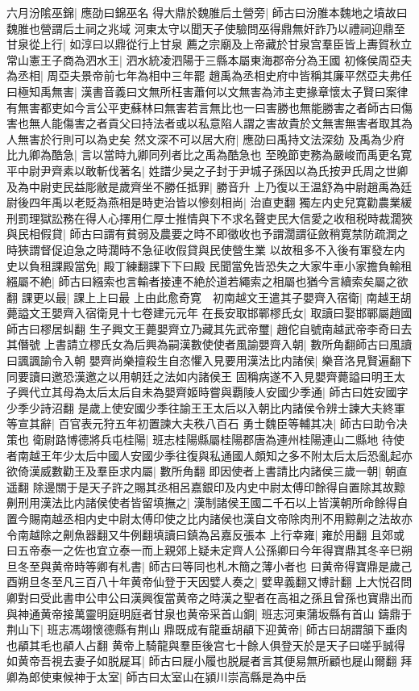 六月汾隂巫錦|{
	應劭曰錦巫名}
得大鼎於魏脽后土營旁|{
	師古曰汾脽本魏地之墳故曰魏脽也營謂后土祠之兆域}
河東太守以聞天子使驗問巫得鼎無奸詐乃以禮祠迎鼎至甘泉從上行|{
	如淳曰以鼎從行上甘泉}
薦之宗廟及上帝藏於甘泉宫羣臣皆上夀賀秋立常山憲王子商為泗水王|{
	泗水統凌泗陽于三縣本屬東海郡帝分為王國}
初條侯周亞夫為丞相|{
	周亞夫景帝前七年為相中三年罷}
趙禹為丞相史府中皆稱其廉平然亞夫弗任曰極知禹無害|{
	漢書音義曰文無所枉害蕭何以文無害為沛主吏掾章懷太子賢曰案律有無害都吏如今言公平吏蘇林曰無害若言無比也一曰害勝也無能勝害之者師古曰傷害也無人能傷害之者貢父曰持法者或以私意陷人謂之害故貴於文無害無害者取其為人無害於行則可以為史矣}
然文深不可以居大府|{
	應劭曰禹持文法深劾}
及禹為少府比九卿為酷急|{
	言以當時九卿同列者比之禹為酷急也}
至晚節吏務為嚴峻而禹更名寛平中尉尹齊素以敢斬伐著名|{
	姓譜少昊之子封于尹城子孫因以為氏按尹氏周之世卿}
及為中尉吏民益彫敝是歲齊坐不勝任抵罪|{
	勝音升}
上乃復以王温舒為中尉趙禹為廷尉後四年禹以老貶為燕相是時吏治皆以慘刻相尚|{
	治直吏翻}
獨左内史兒寛勸農業緩刑罰理獄訟務在得人心擇用仁厚士推情與下不求名聲吏民大信愛之收租税時裁濶狹與民相假貸|{
	師古曰謂有貧弱及農要之時不即徵收也予謂濶謂征斂稍寛禁防疏潤之時狹謂督促迫急之時濶時不急征收假貸與民使營生業}
以故租多不入後有軍發左内史以負租課殿當免|{
	殿丁練翻課下下曰殿}
民聞當免皆恐失之大家牛車小家擔負輸租繦屬不絶|{
	師古曰繦索也言輸者接連不絶於道若繩索之相屬也猶今言續索矣屬之欲翻}
課更以最|{
	課上上曰最}
上由此愈奇寛　初南越文王遣其子嬰齊入宿衛|{
	南越王胡薨謚文王嬰齊入宿衛見十七卷建元元年}
在長安取邯鄲樛氏女|{
	取讀曰娶邯鄲屬趙國師古曰樛居虯翻}
生子興文王薨嬰齊立乃藏其先武帝璽|{
	趙佗自號南越武帝李奇曰去其僭號}
上書請立樛氏女為后興為嗣漢數使使者風諭嬰齊入朝|{
	數所角翻師古曰風讀曰諷諷諭令入朝}
嬰齊尚樂擅殺生自恣懼入見要用漢法比内諸侯|{
	樂音洛見賢遍翻下同要讀曰邀恐漢邀之以用朝廷之法如内諸侯王}
固稱病遂不入見嬰齊薨謚曰明王太子興代立其母為太后太后自未為嬰齊姬時嘗與覇陵人安國少季通|{
	師古曰姓安國字少季少詩沼翻}
是歲上使安國少季往諭王王太后以入朝比内諸侯令辨士諫大夫終軍等宣其辭|{
	百官表元狩五年初置諫大夫秩八百石}
勇士魏臣等輔其决|{
	師古曰助令决策也}
衛尉路博德將兵屯桂陽|{
	班志桂陽縣屬桂陽郡唐為連州桂陽連山二縣地}
待使者南越王年少太后中國人安國少季往復與私通國人頗知之多不附太后太后恐亂起亦欲倚漢威數勸王及羣臣求内屬|{
	數所角翻}
即因使者上書請比内諸侯三歲一朝|{
	朝直遥翻}
除邊關于是天子許之賜其丞相呂嘉銀印及内史中尉太傅印餘得自置除其故黥劓刑用漢法比内諸侯使者皆留填撫之|{
	漢制諸侯王國二千石以上皆漢朝所命餘得自置今賜南越丞相内史中尉太傅印使之比内諸侯也漢自文帝除肉刑不用黥劓之法故亦令南越除之劓魚器翻又牛例翻填讀曰鎮為呂嘉反張本}
上行幸雍|{
	雍於用翻}
且郊或曰五帝泰一之佐也宜立泰一而上親郊上疑未定齊人公孫卿曰今年得寶鼎其冬辛巳朔旦冬至與黄帝時等卿有札書|{
	師古曰等同也札木簡之薄小者也}
曰黄帝得寶鼎是歲己酉朔旦冬至凡三百八十年黄帝仙登于天因嬖人奏之|{
	嬖卑義翻又博計翻}
上大悦召問卿對曰受此書申公申公曰漢興復當黄帝之時漢之聖者在高祖之孫且曾孫也寶鼎出而與神通黄帝接萬靈明庭明庭者甘泉也黄帝采首山銅|{
	班志河東蒲坂縣有首山}
鑄鼎于荆山下|{
	班志馮翊懷德縣有荆山}
鼎既成有龍垂胡䫇下迎黄帝|{
	師古曰胡謂頷下垂肉也䫇其毛也䫇人占翻}
黄帝上騎龍與羣臣後宫七十餘人俱登天於是天子曰嗟乎誠得如黄帝吾視去妻子如脱屣耳|{
	師古曰屣小履也脱屣者言其便易無所顧也屣山爾翻}
拜卿為郎使東候神于太室|{
	師古曰太室山在潁川崇高縣是為中岳}


